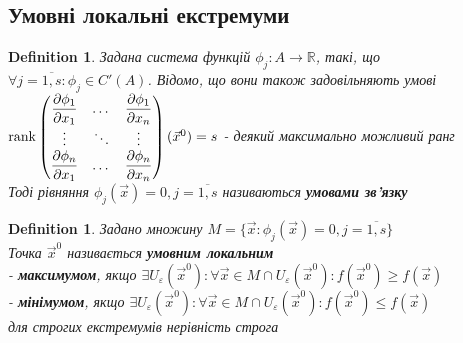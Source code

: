 \documentclass[a4paper, 14pt]{extarticle}
\def\departial#1#2{\dfrac{\partial {#1}}{\partial {#2}}}
\theoremstyle{theoremdd}
\theoremstyle{theoremdd}
\newtheorem{definition}[theorem]{Definition}
\theoremstyle{theoremdd}
\theoremstyle{theoremdd}
\theoremstyle{theoremdd}
\theoremstyle{theoremdd}
\theoremstyle{theoremdd}
\begin{document}
\subsection{Умовні локальні екстремуми}
\begin{definition}
Задана система функцій $\phi_j: A \to \mathbb{R}$, такі, що $\forall j=\overline{1,s}: \phi_j \in C'(A)$. Відомо, що вони також задовільняють умові\\
$\rank \begin{pmatrix}
\departial{\phi_1}{x_1} & \dots & \departial{\phi_1}{x_n} \\
\vdots & \ddots & \vdots \\
\departial{\phi_n}{x_1} & \dots & \departial{\phi_n}{x_n}
\end{pmatrix}(\vec{x}^0) = s$ - деякий максимально можливий ранг\\
Тоді рівняння $\phi_j(\vec{x}) = 0, j=\overline{1,s}$ називаються \textbf{умовами зв'язку}
\end{definition}

\begin{definition}
Задано множину $M=\{ \vec{x}: \phi_j(\vec{x}) = 0, j=\overline{1,s} \}$\\
Точка $\vec{x}^0$ називається \textbf{умовним локальним}\\
- \textbf{максимумом}, якщо $\exists U_{\varepsilon}(\vec{x}^0): \forall \vec{x} \in M \cap U_{\varepsilon}(\vec{x}^0): f(\vec{x}^0) \geq f(\vec{x})$ \\
- \textbf{мінімумом}, якщо $\exists U_{\varepsilon}(\vec{x}^0): \forall \vec{x} \in M \cap U_{\varepsilon}(\vec{x}^0): f(\vec{x}^0) \leq f(\vec{x})$\\
для строгих екстремумів нерівність строга
\end{definition}
\end{document}
